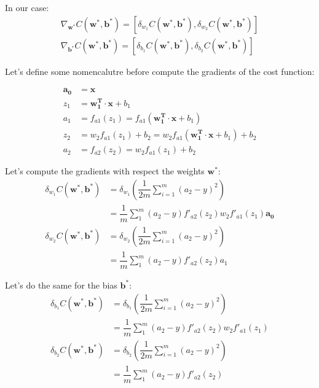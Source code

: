 \documentclass{article}
\begin{document}
In our case:
\begin{align}
  \nabla_{\mathbf{w^*}}C(\mathbf{w^*}, \mathbf{b^*}) = [\delta_{w_1} C(\mathbf{w^*}, \mathbf{b^*}), \delta_{w_2} C(\mathbf{w^*}, \mathbf{b^*})]  \\
  \nabla_{\mathbf{b^*}}C(\mathbf{w^*}, \mathbf{b^*}) = [\delta_{b_1} C(\mathbf{w^*}, \mathbf{b^*}), \delta_{b_2} C(\mathbf{w^*}, \mathbf{b^*})]
\end{align}

Let's define some nomencalutre before compute the gradients of the cost function:

\begin{align}
  \mathbf{a_0} &= \mathbf{x} \\ 
  z_1 &= \mathbf{w_1^T} \cdot \mathbf{x} + b_1 \\
  a_1 &= f_{a1}(z_1) = f_{a1}(\mathbf{w_1^T} \cdot \mathbf{x} + b_1) \\
  z_2 &= w_2 f_{a1}(z_1) + b_2 = w_2 f_{a1}(\mathbf{w_1^T} \cdot \mathbf{x} + b_1) + b_2 \\
  a_2 &= f_{a2}(z_2) = w_2 f_{a1}(z_1) + b_2
\end{align}

Let's compute the gradients with respect the weights $\mathbf{w^*}$:
\begin{align}
  \delta_{w_1} C(\mathbf{w^*}, \mathbf{b^*}) &= \delta_{w_1} ( \dfrac{1}{2m} \sum_{i=1}^m (a_2 - y)^2) \nonumber \\
  &= \dfrac{1}{m} \sum_1^m (a_2 - y) f'_{a2}(z_2) w_2 f'_{a1}(z_1) \mathbf{a_0} \\
  \delta_{w_2} C(\mathbf{w^*}, \mathbf{b^*}) &= \delta_{w_2} ( \dfrac{1}{2m} \sum_{i=1}^m (a_2 - y)^2) \nonumber \\
  &= \dfrac{1}{m} \sum_1^m (a_2 - y) f'_{a2}(z_2) a_1 
\end{align}

Let's do the same for the bias $\mathbf{b^*}$:
\begin{align}
  \delta_{b_1} C(\mathbf{w^*}, \mathbf{b^*}) &= \delta_{b_1} ( \dfrac{1}{2m} \sum_{i=1}^m (a_2 - y)^2) \nonumber \\
  &= \dfrac{1}{m} \sum_1^m (a_2 - y) f'_{a2}(z_2) w_2 f'_{a1}(z_1) \\
  \delta_{b_2} C(\mathbf{w^*}, \mathbf{b^*}) &= \delta_{b_2} ( \dfrac{1}{2m} \sum_{i=1}^m (a_2 - y)^2) \nonumber \\
  &= \dfrac{1}{m} \sum_1^m (a_2 - y) f'_{a2}(z_2)
\end{align}
\end{document}
